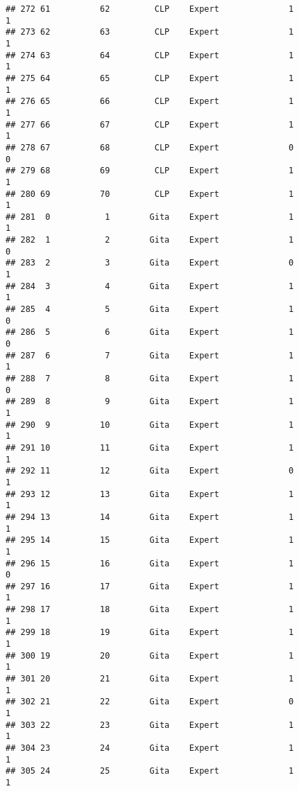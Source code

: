 \documentclass[
]{article}
\begin{document}
\begin{verbatim}
## 272 61          62         CLP    Expert              1                 1
## 273 62          63         CLP    Expert              1                 1
## 274 63          64         CLP    Expert              1                 1
## 275 64          65         CLP    Expert              1                 1
## 276 65          66         CLP    Expert              1                 1
## 277 66          67         CLP    Expert              1                 1
## 278 67          68         CLP    Expert              0                 0
## 279 68          69         CLP    Expert              1                 1
## 280 69          70         CLP    Expert              1                 1
## 281  0           1        Gita    Expert              1                 1
## 282  1           2        Gita    Expert              1                 0
## 283  2           3        Gita    Expert              0                 1
## 284  3           4        Gita    Expert              1                 1
## 285  4           5        Gita    Expert              1                 0
## 286  5           6        Gita    Expert              1                 0
## 287  6           7        Gita    Expert              1                 1
## 288  7           8        Gita    Expert              1                 0
## 289  8           9        Gita    Expert              1                 1
## 290  9          10        Gita    Expert              1                 1
## 291 10          11        Gita    Expert              1                 1
## 292 11          12        Gita    Expert              0                 1
## 293 12          13        Gita    Expert              1                 1
## 294 13          14        Gita    Expert              1                 1
## 295 14          15        Gita    Expert              1                 1
## 296 15          16        Gita    Expert              1                 0
## 297 16          17        Gita    Expert              1                 1
## 298 17          18        Gita    Expert              1                 1
## 299 18          19        Gita    Expert              1                 1
## 300 19          20        Gita    Expert              1                 1
## 301 20          21        Gita    Expert              1                 1
## 302 21          22        Gita    Expert              0                 1
## 303 22          23        Gita    Expert              1                 1
## 304 23          24        Gita    Expert              1                 1
## 305 24          25        Gita    Expert              1                 1

\end{verbatim}
\end{document}
